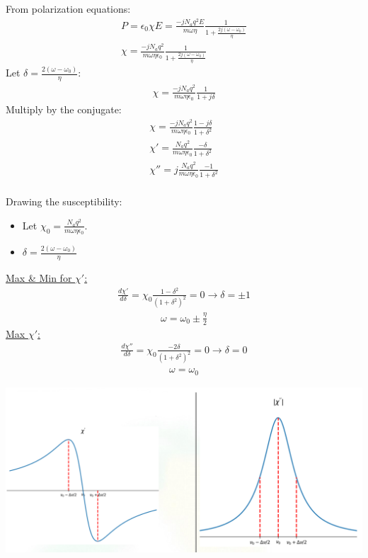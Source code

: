 \documentclass[11pt]{article}
\begin{document}
From polarization equations:
\begin{align*}
    P = \epsilon_0\chi E = \frac{-jN_aq^2E}{m\omega\eta} \frac{1}{1 + \frac{2j(\omega - \omega_0)}{\eta}} \\
    \chi = \frac{-jN_aq^2}{m\omega\eta\epsilon_0} \frac{1}{1 + \frac{2j(\omega - \omega_0)}{\eta}}
\end{align*}
Let $\delta = \frac{2(\omega - \omega_0)}{\eta}$:
\begin{align*}
    \chi = \frac{-jN_aq^2}{m\omega\eta\epsilon_0} \frac{1}{1 + j\delta} 
\end{align*}
Multiply by the conjugate:
\begin{align*}
    \chi = \frac{-jN_aq^2}{m\omega\eta\epsilon_0} \frac{1 - j\delta}{1 + \delta^2} \\
    \chi' = \frac{N_aq^2}{m \omega \eta \epsilon_0} \frac{-\delta}{1 + \delta^2} \\
    \chi'' = j\frac{N_aq^2}{m \omega \eta \epsilon_0} \frac{-1}{1 + \delta^2}
\end{align*}
\\
Drawing the susceptibility:
\begin{itemize}
    \item Let $\chi_0 = \frac{N_aq^2}{m \omega \eta \epsilon_0}$.
    \item $\delta = \frac{2(\omega - \omega_0)}{\eta}$
\end{itemize}
\underline{Max \& Min for $\chi'$:}
\begin{align*}
    \frac{d \chi'}{d \delta} = \chi_0 \frac{1-\delta^2}{(1+\delta^2)^2} = 0 \rightarrow \delta = \pm1
\end{align*}
\begin{align*}
    \omega = \omega_0 \pm \frac{\eta}{2}
\end{align*}
\underline{Max $\chi'$:}
\begin{align*}
    \frac{d \chi''}{d \delta} = \chi_0 \frac{-2\delta}{(1+\delta^2)^2} = 0 \rightarrow \delta = 0
\end{align*}
\begin{align*}
    \omega = \omega_0
\end{align*}
\begin{center}
    \includegraphics[scale=0.5]{3.png}
\end{center}
\end{document}
